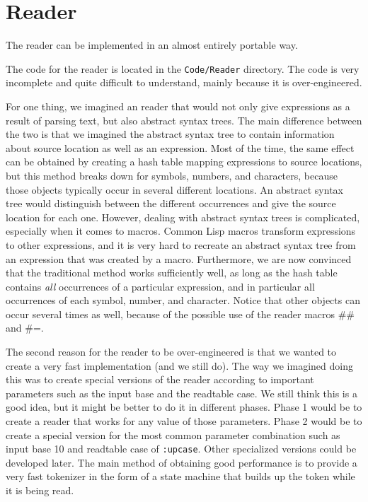 \chapter{Reader}

The reader can be implemented in an almost entirely portable way.  

The code for the reader is located in the \texttt{Code/Reader}
directory.  The code is very incomplete and quite difficult to
understand, mainly because it is over-engineered. 

For one thing, we imagined an reader that would not only give
expressions as a result of parsing text, but also abstract syntax
trees.  The main difference between the two is that we imagined the
abstract syntax tree to contain information about source location as
well as an expression.  Most of the time, the same effect can be
obtained by creating a hash table mapping expressions to source
locations, but this method breaks down for symbols, numbers, and
characters, because those objects typically occur in several different
locations.  An abstract syntax tree would distinguish between the
different occurrences and give the source location for each one.
However, dealing with abstract syntax trees is complicated, especially
when it comes to macros.  Common Lisp macros transform expressions to
other expressions, and it is very hard to recreate an abstract syntax
tree from an expression that was created by a macro.  Furthermore, we
are now convinced that the traditional method works sufficiently well,
as long as the hash table contains \emph{all} occurrences of a
particular expression, and in particular all occurrences of each
symbol, number, and character.  Notice that other objects can occur
several times as well, because of the possible use of the reader
macros \#\# and \#=.

The second reason for the reader to be over-engineered is that we
wanted to create a very fast implementation (and we still do).  The
way we imagined doing this was to create special versions of the
reader according to important parameters such as the input base and
the readtable case.  We still think this is a good idea, but it might
be better to do it in different phases.  Phase 1 would be to create a
reader that works for any value of those parameters.  Phase 2 would be
to create a special version for the most common parameter combination
such as input base 10 and readtable case of \texttt{:upcase}.  Other
specialized versions could be developed later.  The main method of
obtaining good performance is to  provide a very fast tokenizer in the
form of a state machine that builds up the token while it is being
read.  

